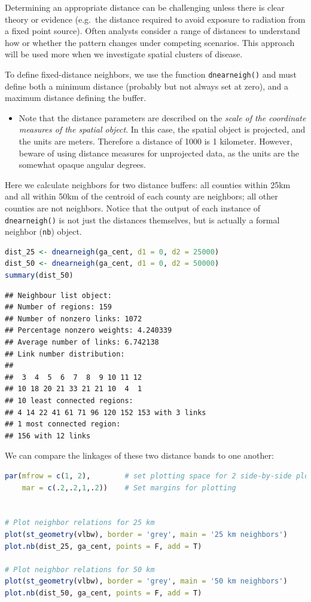 \documentclass[
]{book}
\newcommand{\passthrough}[1]{#1}
\newenvironment{rmdblock}[1]
  {%
  \begin{itemize}
  \renewcommand{\labelitemi}{
    \raisebox{-.7\height}[0pt][0pt]{
      {\setkeys{Gin}{width=3em,keepaspectratio}\texttt{[image: images/\#1]}}
    }
  }
  \item
  }
  {
  \end{itemize}
  }
\newenvironment{rmdcaution}
  {\begin{rmdblock}{caution}}
  {\end{rmdblock}}
\begin{document}
Determining an appropriate distance can be challenging unless there is clear theory or evidence (e.g.~the distance required to avoid exposure to radiation from a fixed point source). Often analysts consider a range of distances to understand how or whether the pattern changes under competing scenarios. This approach will be used more when we investigate spatial clusters of disease.

To define fixed-distance neighbors, we use the function \passthrough{\lstinline!dnearneigh()!} and must define both a minimum distance (probably but not always set at zero), and a maximum distance defining the buffer.

\begin{rmdcaution}
Note that the distance parameters are described on the \emph{scale of the coordinate measures of the spatial object}. In this case, the spatial object is projected, and the units are meters. Therefore a distance of 1000 is 1 kilometer. However, beware of using distance measures for unprojected data, as the units are the somewhat opaque angular degrees.
\end{rmdcaution}

Here we calculate neighbors for two distance buffers: all counties within 25km and all within 50km of the centroid of each county are neighbors; all other counties are not neighbors. Notice that the output of each instance of \passthrough{\lstinline!dnearneigh()!} is not just the distances themselves, but is actually a formal neighbor (\passthrough{\lstinline!nb!}) object.

\begin{lstlisting}[language=R]
dist_25 <- dnearneigh(ga_cent, d1 = 0, d2 = 25000)
dist_50 <- dnearneigh(ga_cent, d1 = 0, d2 = 50000)
summary(dist_50)
\end{lstlisting}

\begin{lstlisting}
## Neighbour list object:
## Number of regions: 159 
## Number of nonzero links: 1072 
## Percentage nonzero weights: 4.240339 
## Average number of links: 6.742138 
## Link number distribution:
## 
##  3  4  5  6  7  8  9 10 11 12 
## 10 18 20 21 33 21 21 10  4  1 
## 10 least connected regions:
## 4 14 22 41 61 71 96 120 152 153 with 3 links
## 1 most connected region:
## 156 with 12 links
\end{lstlisting}

We can compare the linkages of these two distance bands to one another:

\begin{lstlisting}[language=R]
par(mfrow = c(1, 2),        # set plotting space for 2 side-by-side plots
    mar = c(.2,.2,1,.2))    # Set margins for plotting


# Plot neighbor relations for 25 km
plot(st_geometry(vlbw), border = 'grey', main = '25 km neighbors')
plot.nb(dist_25, ga_cent, points = F, add = T)

# Plot neighbor relations for 50 km
plot(st_geometry(vlbw), border = 'grey', main = '50 km neighbors')
plot.nb(dist_50, ga_cent, points = F, add = T)
\end{lstlisting}
\end{document}
